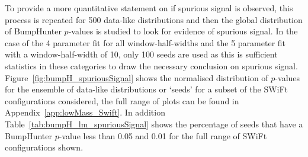 To provide a more quantitative statement on if spurious signal is observed,
this process is repeated for 500 data-like distributions and then the global distribution of {\sc BumpHunter} $p$-values is studied to look for evidence of spurious signal.
In the case of the 4 parameter fit for all window-half-widths and the 5 parameter fit with a window-half-width of 10,
only 100 seeds are used as this is sufficient statistics in these categories to draw the necessary conclusion on spurious signal.
Figure~\ref{fig:bumpH_spuriousSignal} shows the normalised distribution of $p$-values for the ensemble of data-like distributions or `seeds'
for a subset of the SWiFt configurations considered, the full range of plots can be found in Appendix~\ref{app:lowMass_Swift}.
In addition Table~\ref{tab:bumpH_lm_spuriousSignal} shows the percentage of seeds that have a {\sc BumpHunter} $p$-value less than %
0.05 and 0.01 for the full range of SWiFt configurations shown.

